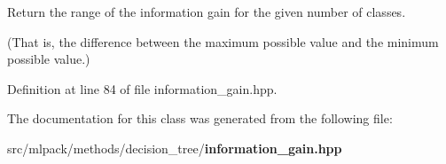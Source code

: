 Return the range of the information gain for the given number of classes. 

(That is, the difference between the maximum possible value and the minimum possible value.) 

Definition at line 84 of file information\+\_\+gain.\+hpp.



The documentation for this class was generated from the following file\+:\begin{DoxyCompactItemize}
\item 
src/mlpack/methods/decision\+\_\+tree/{\bf information\+\_\+gain.\+hpp}\end{DoxyCompactItemize}
